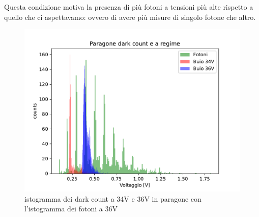 Questa condizione motiva la presenza di più fotoni a tensioni più alte rispetto a quello che ci aspettavamo: ovvero di avere più misure di singolo fotone che altro.\\
\begin{figure}[h]
    \centering
    \includegraphics[width=0.6\linewidth]{Photomultiplier/assets/Paragone_dark_count.pdf}
    \caption{istogramma dei dark count a 34V e 36V in paragone con l'istogramma dei fotoni a 36V}
    \label{fig:dark_count}
\end{figure}